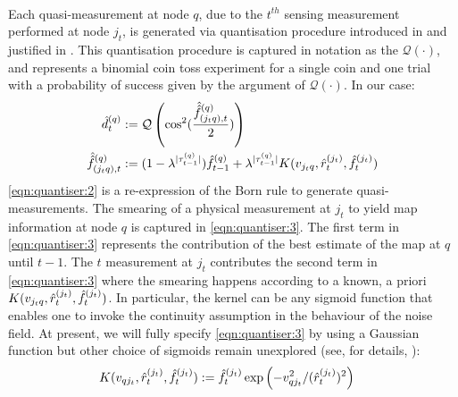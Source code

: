 \\
Each quasi-measurement at node $q$, due to the $t^{th}$ sensing measurement performed at node $j_t$, is generated via quantisation procedure introduced in \cite{riddhi_paper_1} and justified in \cite{riddhi_paper_2}. This quantisation procedure is captured in notation as the $\mathcal{Q}(\cdot)$, and represents a binomial coin toss experiment for a single coin and one trial with a probability of success given by the argument of $\mathcal{Q}(\cdot)$. In our case:
\\
\begin{align}
	\hat{d}^{( q )}_{t} & :=\mathcal{Q}\left( \cos^2(\frac{\hat{\hat{f}}^{(q)}_{(j_tq),t}}{2}) \label{eqn:quantiser:2} \right) \\
	\hat{\hat{f}}^{(q)}_{(j_tq),t} & :=  (1 - \lambda^{|\tau^{(q)}_{t-1}|})\hat{f}^{( q )}_{t-1} + \lambda^{|\tau^{(q)}_{t-1}|}K(v_{j_tq},\hat{r}^{( j_t )}_{t}, \hat{f}^{( j_t )}_{t}) \label{eqn:quantiser:3}
\end{align} \cref{eqn:quantiser:2} is a re-expression of the Born rule to generate quasi-measurements. The smearing of a physical measurement at $j_t$ to yield map information at node $q$ is captured in \cref{eqn:quantiser:3}. The first term in \cref{eqn:quantiser:3} represents the contribution of the best estimate of the map at $q$ until $t-1$. The $t$ measurement at $j_t$ contributes the second term in \cref{eqn:quantiser:3} where the smearing happens according to a known, a priori $K(v_{j_tq},\hat{r}^{( j_t )}_{t}, \hat{f}^{( j_t )}_{t})$. In particular,  the kernel can be any sigmoid function that enables one to invoke the continuity assumption in the behaviour of the noise field. At present, we will fully specify \cref{eqn:quantiser:3} by using  a Gaussian function but other choice of sigmoids remain unexplored (see, for details, \cite{ito1992approximation}):
\begin{align}
	K(v_{qj_t},\hat{r}^{( j_t )}_{t}, \hat{f}^{( j_t )}_{t}) &:= \hat{f}^{( j_t )}_{t}\exp\left(-v_{qj_t}^2 / (\hat{r}^{( j_t )}_{t})^2 \right)  \label{eqn:kernel}
\end{align} \\
